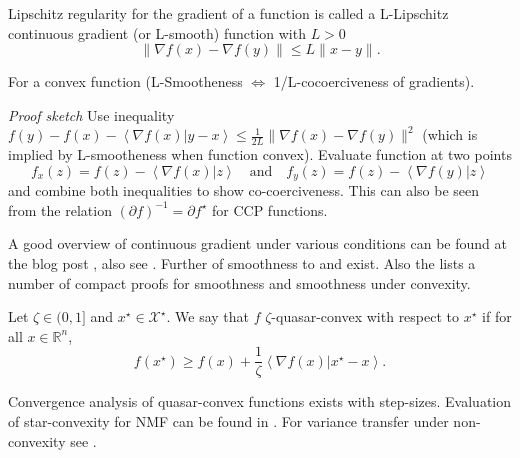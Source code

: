 \documentclass[preview, multi={definition, remark, theorem, proposition, example, literature}, border=0.2in]{standalone}
\newcommand{\innerp}[2]{\left\langle #1 \vert #2 \right\rangle}
\begin{document}
\begin{definition}[label=ceh4aors, name=L-Smooth ({\textit or L-Lipschitz Continuous Gradient})]
	Lipschitz regularity for the gradient of a function is called a 
	L-Lipschitz continuous gradient (or L-smooth) function with \( L > 0\)
	\[
		\lVert\nabla f(x) - \nabla f(y)\rVert\leq L\lVert x - y\rVert.
	\]

	\begin{remark}[label=5vsiv5i2, name=Cocoerciveness of L-Smooth functions]
		For a convex function (L-Smootheness \( \Longleftrightarrow \)
		1/L-cocoerciveness of gradients).

		\textit{Proof sketch} Use inequality \(f(y)-f(x)-\innerp{\nabla
		f(x)}{y-x} \leq \frac{1}{2L}\lVert\nabla f(x) - \nabla
		f(y)\rVert^2\) (which is implied by L-smootheness when function
		convex). Evaluate function at two points
		\[
			f_x(z)= f(z) - \innerp{\nabla f(x)}{z} \quad \text{and}
			\quad f_y(z) = f(z) - \innerp{\nabla f(y)}{z}
		\]
		and combine both inequalities to show co-coerciveness. This can
		also be seen from the relation \( (\partial f)^{-1} = \partial f^\star\)
		for CCP functions.
	\end{remark}

	\begin{literature}[label=2tz2l_0t]
		A good overview of continuous gradient under various conditions can be found at the blog post \cite{zhou_continuous_gradient}, also see \cite[Appendix A][theorem.A.1.1]{acceleration_methods}. Further \cite[connections][theorem.3.4]{structured_nonconvex_functions} of smoothness to \cite[expected-smoothness][equation.3.13]{structured_nonconvex_functions} and \cite[expected residual][assumption.3.1]{structured_nonconvex_functions} exist. Also the \cite[Section 2.5][subsection.2.5]{garrigos2023handbook} lists a number of compact proofs for smoothness and smoothness under convexity.

	\end{literature}
\end{definition}
\begin{definition}[label=3m5jm_az, name=Quasar Convex]
	Let \( \zeta\in(0,1] \) and \( x^\star\in\mathcal X^\star\). We say that \( f \) \( \zeta \)-quasar-convex with respect to \( x^\star \) if for all \( x\in\mathbb R^n \),
	\[
		f(x^\star) \geq f(x) + \frac{1}{\zeta}\innerp{\nabla f(x)}{x^\star - x}.
	\]

	\begin{literature}[label=c9swuw97]
		Convergence analysis of quasar-convex functions exists with \cite[constant and decreasing][subsection.4.1]{structured_nonconvex_functions} step-sizes. Evaluation of star-convexity for NMF can be found in \cite{star_convexity_nmf}. For variance transfer under non-convexity see \cite[Example 2.2][example.2.2]{sgd_arbitrary_sampling}.
	\end{literature}
\end{definition}
\end{document}
